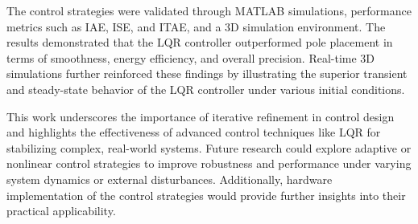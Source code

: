 \documentclass[conference]{IEEEtran}
\begin{document}
The control strategies were validated through MATLAB simulations, performance metrics such as IAE, ISE, and ITAE, and a 3D simulation environment. The results demonstrated that the LQR controller outperformed pole placement in terms of smoothness, energy efficiency, and overall precision. Real-time 3D simulations further reinforced these findings by illustrating the superior transient and steady-state behavior of the LQR controller under various initial conditions.

This work underscores the importance of iterative refinement in control design and highlights the effectiveness of advanced control techniques like LQR for stabilizing complex, real-world systems. Future research could explore adaptive or nonlinear control strategies to improve robustness and performance under varying system dynamics or external disturbances. Additionally, hardware implementation of the control strategies would provide further insights into their practical applicability.



\end{document}
